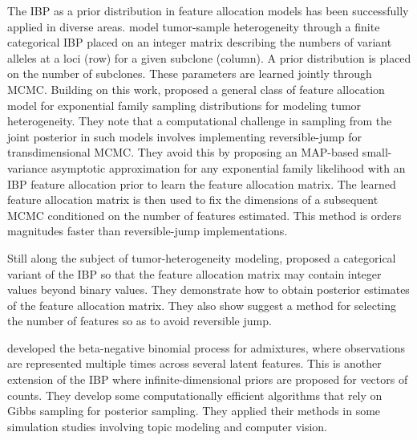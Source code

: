 \documentclass[12pt,]{article}
\begin{document}
The IBP as a prior distribution in feature allocation models has been
successfully applied in diverse areas. \cite{lee2016bayesian} model
tumor-sample heterogeneity through a finite categorical IBP placed on an
integer matrix describing the numbers of variant alleles at a loci (row) for a
given subclone (column). A prior distribution is placed on the number of
subclones. These parameters are learned jointly through MCMC.  Building on this
work, \cite{xu2015mad} proposed a general class of feature allocation model for
exponential family sampling distributions for modeling tumor heterogeneity.
They note that a computational challenge in sampling from the joint posterior
in such models involves implementing reversible-jump
\citep{green1995reversible} for transdimensional MCMC. They avoid this by
proposing an MAP-based small-variance asymptotic approximation for any
exponential family likelihood with an IBP feature allocation prior to learn the
feature allocation matrix. The learned feature allocation matrix is then used
to fix the dimensions of a subsequent MCMC conditioned on the number of
features estimated. This method is orders magnitudes faster than
reversible-jump implementations.

Still along the subject of tumor-heterogeneity modeling,
\cite{sengupta2014bayclone} proposed a categorical variant of the IBP so that
the feature allocation matrix may contain integer values beyond binary values.
They demonstrate how to obtain posterior estimates of the feature allocation
matrix. They also show suggest a method for selecting the number of features so
as to avoid reversible jump.

\cite{broderick2013feature} developed the beta-negative binomial process for
admixtures, where observations are represented multiple times across several
latent features. This is another extension of the IBP where
infinite-dimensional priors are proposed for vectors of counts. They develop
some computationally efficient algorithms that rely on Gibbs sampling for 
posterior sampling. They applied their methods in some simulation studies 
involving topic modeling and computer vision.



\end{document}
